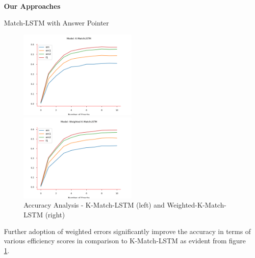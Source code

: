 \documentclass{article}
\begin{document}
\begin{psection}{\textbf{Our Approaches}}
\begin{psubsection}{Match-LSTM with Answer Pointer}
    \begin{figure}[ht!]
		       \begin{minipage}{0.47\textwidth}
					\centering
					\includegraphics[trim={0 4mm 0 0},clip, width=220px]{includes/plots/match-lstm/accuracy-k-match-lstm.png}
					\caption*{(a) K-Match-LSTM}
				\end{minipage}
				\begin{minipage}{0.47\textwidth}

					\centering
					\includegraphics[trim={0 4mm 0 0},clip,width=220px]{includes/plots/match-lstm/accuracy-weighted-k-match-lstm.png}
					\caption*{(b) Weighted-K-Match-LSTM}
				\end{minipage}
				\caption{Accuracy Analysis - K-Match-LSTM (left) and Weighted-K-Match-LSTM (right)}
				\label{fig:weighted-match-comparison}
	\end{figure}
     Further adoption of weighted errors significantly improve the accuracy in terms of various efficiency scores in comparison to K-Match-LSTM as evident from figure \ref{fig:weighted-match-comparison}.



\end{psubsection}
\end{psection}
\end{document}
